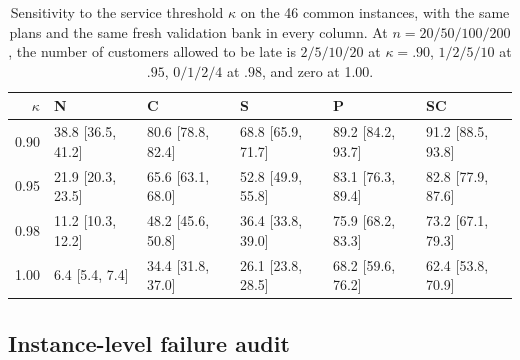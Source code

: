 \begin{table}[H]
\centering
\scriptsize
\caption{Sensitivity to the service threshold $\kappa$ on the 46 common instances, with the same plans and the same fresh validation bank in every column. At $n=20/50/100/200$, the number of customers allowed to be late is $2/5/10/20$ at $\kappa=.90$, $1/2/5/10$ at $.95$, $0/1/2/4$ at $.98$, and zero at 1.00.}
\label{tab:kappa}
\begin{tabular}{rlllll}
\toprule
$\kappa$ & N & C & S & P & SC\\
\midrule
0.90 & 38.8 [36.5, 41.2] & 80.6 [78.8, 82.4] & 68.8 [65.9, 71.7] & 89.2 [84.2, 93.7] & 91.2 [88.5, 93.8]\\
0.95 & 21.9 [20.3, 23.5] & 65.6 [63.1, 68.0] & 52.8 [49.9, 55.8] & 83.1 [76.3, 89.4] & 82.8 [77.9, 87.6]\\
0.98 & 11.2 [10.3, 12.2] & 48.2 [45.6, 50.8] & 36.4 [33.8, 39.0] & 75.9 [68.2, 83.3] & 73.2 [67.1, 79.3]\\
1.00 & 6.4 [5.4, 7.4] & 34.4 [31.8, 37.0] & 26.1 [23.8, 28.5] & 68.2 [59.6, 76.2] & 62.4 [53.8, 70.9]\\
\bottomrule
\end{tabular}
\end{table}


\subsection{Instance-level failure audit}\label{sec:failure-audit}


